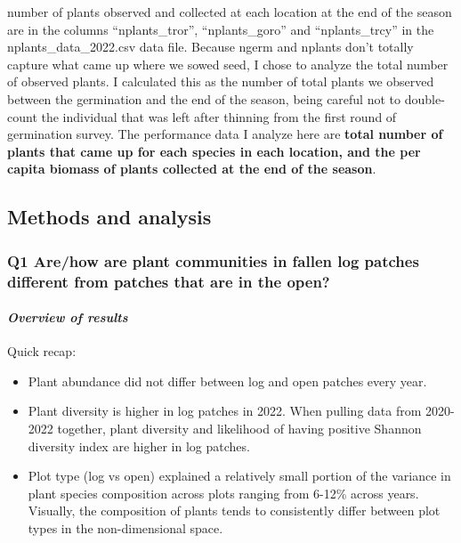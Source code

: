 \documentclass[
]{article}
\providecommand{\tightlist}{%
  \setlength{\itemsep}{0pt}\setlength{\parskip}{0pt}}
\begin{document}
\begin{itemize}
  number of plants observed and collected at each location at the end of
  the season are in the columns ``nplants\_tror'', ``nplants\_goro'' and
  ``nplants\_trcy'' in the nplants\_data\_2022.csv data file. Because
  ngerm and nplants don't totally capture what came up where we sowed
  seed, I chose to analyze the total number of observed plants. I
  calculated this as the number of total plants we observed between the
  germination and the end of the season, being careful not to
  double-count the individual that was left after thinning from the
  first round of germination survey. The performance data I analyze here
  are \textbf{total number of plants that came up for each species in
  each location, and the per capita biomass of plants collected at the
  end of the season}.
\end{itemize}

\hypertarget{methods-and-analysis}{%
\subsection{Methods and analysis}\label{methods-and-analysis}}

\hypertarget{q1-arehow-are-plant-communities-in-fallen-log-patches-different-from-patches-that-are-in-the-open}{%
\subsubsection{\texorpdfstring{\textbf{Q1 Are/how are plant communities
in fallen log patches different from patches that are in the open?}
}{Q1 Are/how are plant communities in fallen log patches different from patches that are in the open?  }}\label{q1-arehow-are-plant-communities-in-fallen-log-patches-different-from-patches-that-are-in-the-open}}

\hypertarget{overview-of-results}{%
\paragraph{\texorpdfstring{\emph{Overview of results}
}{Overview of results  }}\label{overview-of-results}}

Quick recap:

\begin{itemize}
\tightlist
\item
  Plant abundance did not differ between log and open patches every
  year.
\item
  Plant diversity is higher in log patches in 2022. When pulling data
  from 2020-2022 together, plant diversity and likelihood of having
  positive Shannon diversity index are higher in log patches.
\item
  Plot type (log vs open) explained a relatively small portion of the
  variance in plant species composition across plots ranging from 6-12\%
  across years. Visually, the composition of plants tends to
  consistently differ between plot types in the non-dimensional space.
\end{itemize}
\end{document}
